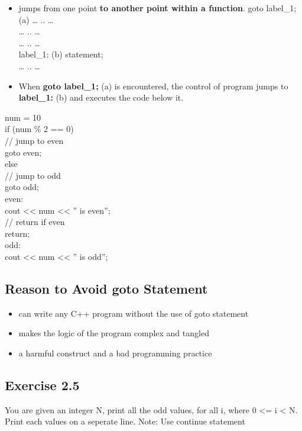 \documentclass[
]{article}
\providecommand{\tightlist}{%
  \setlength{\itemsep}{0pt}\setlength{\parskip}{0pt}}
\begin{document}
\begin{itemize}
\tightlist
\item
  jumps from one point \textbf{to another point within a function}. goto
  label\_1; (a) \ldots{} .. \ldots{}\\
  \ldots{} .. \ldots{}\\
  \ldots{} .. \ldots{}\\
  label\_1: (b) statement;\\
  \ldots{} .. \ldots{}
\item
  When \textbf{goto label\_1;} (a) is encountered, the control of
  program jumps to \textbf{label\_1:} (b) and executes the code below
  it.
\end{itemize}

num = 10\\
if (num \% 2 == 0)\\
// jump to even\\
goto even;\\
else\\
// jump to odd\\
goto odd;\\
even:\\
cout \textless\textless{} num \textless\textless{} '' is even'';\\
// return if even\\
return;\\
odd:\\
cout \textless\textless{} num \textless\textless{} '' is odd'';

\subsection{Reason to Avoid goto
Statement}\label{reason-to-avoid-goto-statement}

\begin{itemize}
\tightlist
\item
  can write any C++ program without the use of goto statement
\item
  makes the logic of the program complex and tangled
\item
  a harmful construct and a bad programming practice
\end{itemize}

\subsection{Exercise 2.5}\label{exercise-2.5}

You are given an integer N, print all the odd values, for all i, where 0
\textless= i \textless{} N. Print each values on a seperate line. Note:
Use continue statement
\end{document}
